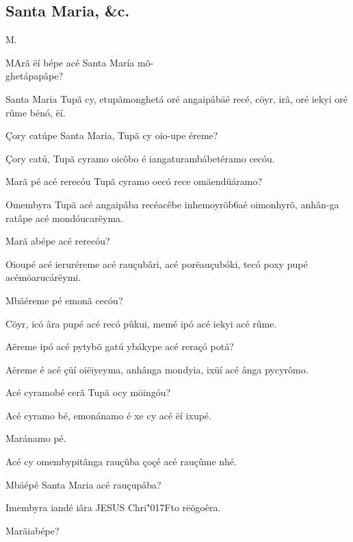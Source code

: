 \documentclass[openany,titlepage,12pt]{book}
\newcommand{\lgS}{\char"017F}
\newcommand{\comecalista}[5]{
    \hspace*{-11.7pt}
    \begin{minipage}[t]{0.08\linewidth}
        \flushright #1\\#2
    \end{minipage}
    \hspace{0pt}
    \begin{minipage}[t]{0.94\linewidth}
        \lettrine
        [findent =2pt, nindent=0pt,  lines=2]
        {#3}{#4}#5
    \end{minipage}
    \vspace*{-3pt}
}
\begin{document}
\subsection{Santa Maria, \&c.}
\unskip\vspace*{2pt}
\comecalista{M.}{}{M}{A}
    {rã ëí bépe acé Santa María mõ-\\
    ghetápapâpe?}
\begin{altereven}
    \item Santa Maria Tupã cy, etupãmonghetá\linebreak
    oré angaipâbäé recé, cöyr, irã, oré iekyi\linebreak
    oré rûme bénó, ëí.
    \item Çory catúpe Santa Maria, Tupã cy oio-upe éreme?
    \item Çory catú, Tupã cyramo oicôbo é iangaturambábetéramo
    cecóu.
    \item Marã pé acé rerecóu Tupã cyramo oecó rece omäendüáramo?
    \item Omembyra Tupã acé angaipâba recé\linebreak acêbe 
    inhemoyrõb6aé oimonhyrõ, anhân-ga ratâpe acé mondóucarëyma.
    \item Marã abépe acé rerecóu?
    \item Oioupé acé ieruréreme acé rauçubâri,\linebreak
    acé porëauçubóki, tecó poxy pupé acé\linebreak möarucárëymi.
    \item Mbäéreme pé emonã cecóu?
    \item Cöyr, icó âra pupé acé recó pûkui, memé
    ipó acé iekyi acé rûme.
    \item Aëreme  ipó acé pytybõ gatú ybákype\linebreak
    acé reraçó potá?
    \item Aëreme é acé çüí oiëiyeyma, anhânga\linebreak
    mondyia, ixüí acé ânga pycyrômo.
    \item Acé cyramobé cerã Tupã ocy möingóu?
    \item Acé cyramo bé, emonánamo é xe cy acé ëí ixupé.
    \item Maránamo pé.
    \item Acé cy omembypitânga rauçûba çoçé acé rauçûme nhé. 
    \item Mbäépé Santa Maria acé rauçupâba?
    \item Imembyra iandé iâra JESUS Chri\lgS to rëõgoêra.
    \item Marãiabépe?

\end{altereven}
\end{document}
